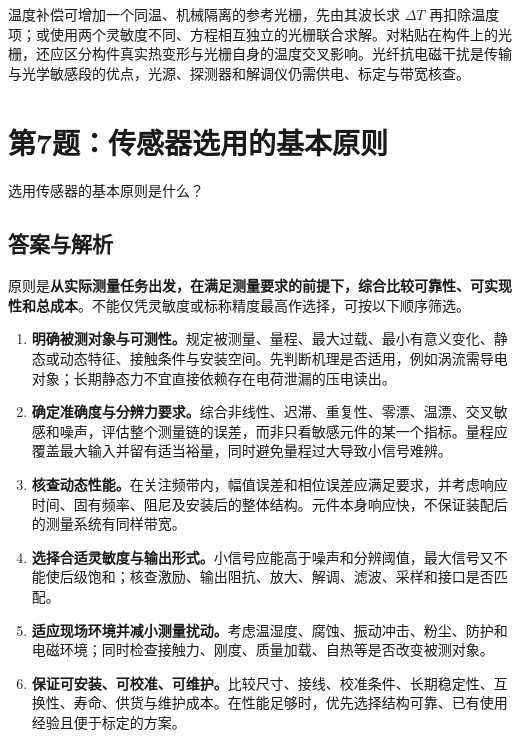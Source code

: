 温度补偿可增加一个同温、机械隔离的参考光栅，先由其波长求 $\Delta T$ 再扣除温度项；或使用两个灵敏度不同、方程相互独立的光栅联合求解。对粘贴在构件上的光栅，还应区分构件真实热变形与光栅自身的温度交叉影响。光纤抗电磁干扰是传输与光学敏感段的优点，光源、探测器和解调仪仍需供电、标定与带宽核查。

\section{第7题：传感器选用的基本原则}
\label{hw:4-7}
\begin{hwquestion}
选用传感器的基本原则是什么？
\end{hwquestion}

\subsection*{答案与解析}
原则是\textbf{从实际测量任务出发，在满足测量要求的前提下，综合比较可靠性、可实现性和总成本}。不能仅凭灵敏度或标称精度最高作选择，可按以下顺序筛选。

\begin{enumerate}
\item \textbf{明确被测对象与可测性。}规定被测量、量程、最大过载、最小有意义变化、静态或动态特征、接触条件与安装空间。先判断机理是否适用，例如涡流需导电对象；长期静态力不宜直接依赖存在电荷泄漏的压电读出。
\item \textbf{确定准确度与分辨力要求。}综合非线性、迟滞、重复性、零漂、温漂、交叉敏感和噪声，评估整个测量链的误差，而非只看敏感元件的某一个指标。量程应覆盖最大输入并留有适当裕量，同时避免量程过大导致小信号难辨。
\item \textbf{核查动态性能。}在关注频带内，幅值误差和相位误差应满足要求，并考虑响应时间、固有频率、阻尼及安装后的整体结构。元件本身响应快，不保证装配后的测量系统有同样带宽。
\item \textbf{选择合适灵敏度与输出形式。}小信号应能高于噪声和分辨阈值，最大信号又不能使后级饱和；核查激励、输出阻抗、放大、解调、滤波、采样和接口是否匹配。
\item \textbf{适应现场环境并减小测量扰动。}考虑温湿度、腐蚀、振动冲击、粉尘、防护和电磁环境；同时检查接触力、刚度、质量加载、自热等是否改变被测对象。
\item \textbf{保证可安装、可校准、可维护。}比较尺寸、接线、校准条件、长期稳定性、互换性、寿命、供货与维护成本。在性能足够时，优先选择结构可靠、已有使用经验且便于标定的方案。
\end{enumerate}

